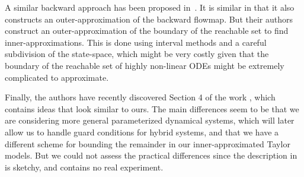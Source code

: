 \documentclass{sig-alternate-05-2015} %
\newcommand\ForAuthors[1]%
 {\par\smallskip                     %
  \begin{center}%
   \fbox%
   {\parbox{0.9\linewidth}%
    {\raggedright\sc--- #1}%
   }%
  \end{center}%
  \par\smallskip                     %
 }
\begin{document}
A similar backward approach %
has been proposed in~\cite{underapprox16}. It is similar in that it also constructs 
an outer-approximation of the backward flowmap. But their authors construct an outer-approximation
of the boundary of the reachable set to find inner-approximations. This is done using 
interval methods and a careful subdivision of the state-space, which might be very costly
given that the boundary of the reachable set of highly non-linear ODEs might be extremely 
complicated to approximate. 


Finally, the authors have recently discovered Section 4 of the work \cite{Gold06}, which
contains
ideas that look similar to ours. The main differences seem to be that we are considering more
general parameterized dynamical systems, which will later allow us to handle guard conditions for hybrid systems, 
and that we have a different scheme for bounding
the remainder in our inner-approximated Taylor models. But we could not assess the practical
differences since the description in \cite{Gold06} is sketchy, and contains no real experiment. 



\end{document}
